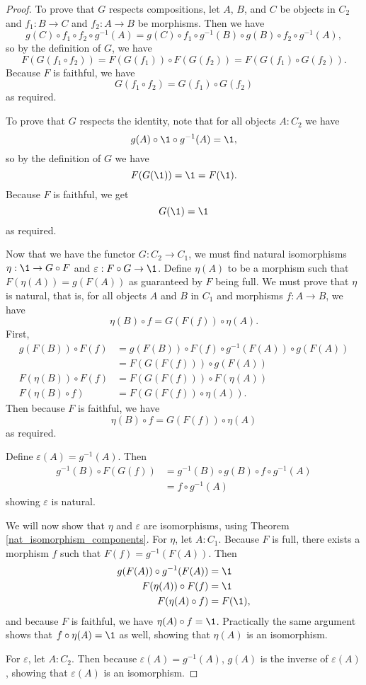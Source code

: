 \documentclass[../math.tex]{subfiles}
\begin{document}
\begin{proof}
    To prove that $G$ respects compositions, let $A$, $B$, and $C$ be objects in
    $C_2$ and $f_1 : B \to C$ and $f_2 : A \to B$ be morphisms.  Then we have
    \[
        g(C) \circ f_1 \circ f_2 \circ g^{-1}(A) = g(C) \circ f_1 \circ g^{-1}(B) \circ
        g(B) \circ f_2 \circ g^{-1}(A),
    \]
    so by the definition of $G$, we have
    \[
        F(G(f_1 \circ f_2)) = F(G(f_1)) \circ F(G(f_2))
        = F(G(f_1) \circ G(f_2)).
    \]
    Because $F$ is faithful, we have
    \[
        G(f_1 \circ f_2) = G(f_1) \circ G(f_2)
    \]
    as required.

    To prove that $G$ respects the identity, note that for all objects $A : C_2$
    we have
    \[
        g(A) \circ \1 \circ g^{-1}(A) = \1,
    \]
    so by the definition of $G$ we have
    \[
        F(G(\1)) = \1 = F(\1).
    \]
    Because $F$ is faithful, we get
    \[
        G(\1) = \1
    \]
    as required.

    Now that we have the functor $G : C_2 \to C_1$, we must find natural
    isomorphisms $\eta : \1 \to G \circ F$ and $\varepsilon : F \circ G \to \1$.
    Define $\eta(A)$ to be a morphism such that $F(\eta(A)) = g(F(A))$ as
    guaranteed by $F$ being full.  We must prove that $\eta$ is natural, that
    is, for all objects $A$ and $B$ in $C_1$ and morphisms $f : A \to B$, we
    have
    \[
        \eta(B) \circ f = G(F(f)) \circ \eta(A).
    \]
    First,
    \begin{align*}
        g(F(B)) \circ F(f)
            &= g(F(B)) \circ F(f) \circ g^{-1}(F(A)) \circ g(F(A)) \\
                           &= F(G(F(f))) \circ g(F(A)) \\
        F(\eta(B)) \circ F(f) &= F(G(F(f))) \circ F(\eta(A)) \\
        F(\eta(B) \circ f) &= F(G(F(f)) \circ \eta(A)).
    \end{align*}
    Then because $F$ is faithful, we have
    \[
        \eta(B) \circ f = G(F(f)) \circ \eta(A)
    \]
    as required.

    Define $\varepsilon(A) = g^{-1}(A)$.  Then
    \begin{align*}
        g^{-1}(B) \circ F(G(f))
        &= g^{-1}(B) \circ g(B) \circ f \circ g^{-1}(A) \\
        &= f \circ g^{-1}(A)
    \end{align*}
    showing $\varepsilon$ is natural.

    We will now show that $\eta$ and $\varepsilon$ are isomorphisms, using
    Theorem \ref{nat_isomorphism_components}.  For $\eta$, let $A : C_1$.
    Because $F$ is full, there exists a morphism $f$ such that $F(f) =
    g^{-1}(F(A))$.  Then
    \begin{align*}
        g(F(A)) \circ g^{-1}(F(A)) &= \1 \\
        F(\eta(A)) \circ F(f) &= \1 \\
        F(\eta(A) \circ f) &= F(\1),
    \end{align*}
    and because $F$ is faithful, we have $\eta(A) \circ f = \1$.  Practically
    the same argument shows that $f \circ \eta(A) = \1$ as well, showing that
    $\eta(A)$ is an isomorphism.

    For $\varepsilon$, let $A : C_2$.  Then because $\varepsilon(A) =
    g^{-1}(A)$, $g(A)$ is the inverse of $\varepsilon(A)$, showing that
    $\varepsilon(A)$ is an isomorphism.
\end{proof}
\end{document}
